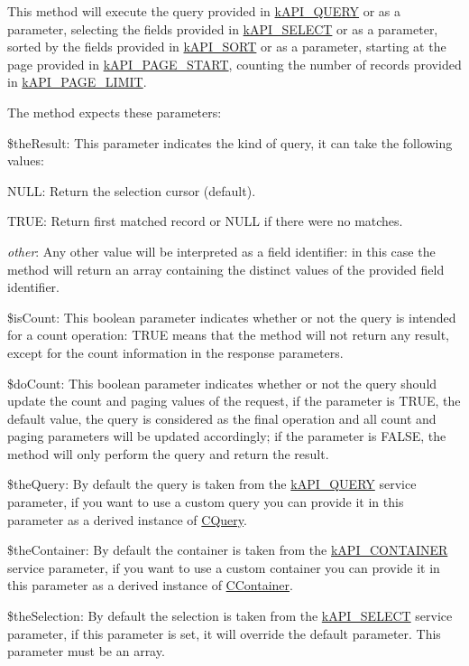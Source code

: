 This method will execute the query provided in \hyperlink{}{k\-A\-P\-I\-\_\-\-Q\-U\-E\-R\-Y} or as a parameter, selecting the fields provided in \hyperlink{}{k\-A\-P\-I\-\_\-\-S\-E\-L\-E\-C\-T} or as a parameter, sorted by the fields provided in \hyperlink{}{k\-A\-P\-I\-\_\-\-S\-O\-R\-T} or as a parameter, starting at the page provided in \hyperlink{}{k\-A\-P\-I\-\_\-\-P\-A\-G\-E\-\_\-\-S\-T\-A\-R\-T}, counting the number of records provided in \hyperlink{}{k\-A\-P\-I\-\_\-\-P\-A\-G\-E\-\_\-\-L\-I\-M\-I\-T}.

The method expects these parameters\-:


\begin{DoxyItemize}
\item {\ttfamily \$the\-Result}\-: This parameter indicates the kind of query, it can take the following values\-: 
\begin{DoxyItemize}
\item {\ttfamily N\-U\-L\-L}\-: Return the selection cursor (default). 
\item {\ttfamily T\-R\-U\-E}\-: Return first matched record or {\ttfamily N\-U\-L\-L} if there were no matches. 
\item {\itshape other}\-: Any other value will be interpreted as a field identifier\-: in this case the method will return an array containing the distinct values of the provided field identifier. 
\end{DoxyItemize}
\item {\ttfamily \$is\-Count}\-: This boolean parameter indicates whether or not the query is intended for a count operation\-: {\ttfamily T\-R\-U\-E} means that the method will not return any result, except for the count information in the response parameters. 
\item {\ttfamily \$do\-Count}\-: This boolean parameter indicates whether or not the query should update the count and paging values of the request, if the parameter is {\ttfamily T\-R\-U\-E}, the default value, the query is considered as the final operation and all count and paging parameters will be updated accordingly; if the parameter is {\ttfamily F\-A\-L\-S\-E}, the method will only perform the query and return the result. 
\item {\ttfamily \$the\-Query}\-: By default the query is taken from the \hyperlink{}{k\-A\-P\-I\-\_\-\-Q\-U\-E\-R\-Y} service parameter, if you want to use a custom query you can provide it in this parameter as a derived instance of \hyperlink{class_c_query}{C\-Query}. 
\item {\ttfamily \$the\-Container}\-: By default the container is taken from the \hyperlink{}{k\-A\-P\-I\-\_\-\-C\-O\-N\-T\-A\-I\-N\-E\-R} service parameter, if you want to use a custom container you can provide it in this parameter as a derived instance of \hyperlink{class_c_container}{C\-Container}. 
\item {\ttfamily \$the\-Selection}\-: By default the selection is taken from the \hyperlink{}{k\-A\-P\-I\-\_\-\-S\-E\-L\-E\-C\-T} service parameter, if this parameter is set, it will override the default parameter. This parameter must be an array. 
\end{DoxyItemize}

